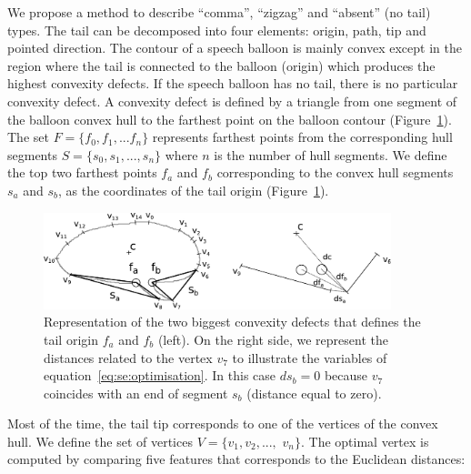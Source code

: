 We propose a method to describe ``comma'', ``zigzag'' and ``absent'' (no tail) types.
The tail can be decomposed into four elements: origin, path, tip and pointed direction.
The contour of a speech balloon is mainly convex except in the region where the tail is connected to the balloon (origin) which produces the highest convexity defects.
If the speech balloon has no tail, there is no particular convexity defect.
A convexity defect is defined by a triangle from one segment of the balloon convex hull to the farthest point on the balloon contour (Figure~\ref{fig:se:convexity_defects}).
The set $F=\{f_0,f_1,...f_n\}$ represents farthest points from the corresponding hull segments $S=\{s_0, s_1,...,s_n\}$ where $n$ is the number of hull segments.
We define the top two farthest points $f_a$ and $f_b$ corresponding to the convex hull segments $s_a$ and $s_b$, as the coordinates of the tail origin (Figure~\ref{fig:se:convexity_defects}).

    \begin{figure}[ht]%
      \centering
      \includegraphics[width=0.9\textwidth]{tail_description.pdf}
    \caption[Representation of the two biggest convexity defects that defines the tail origin]{Representation of the two biggest convexity defects that defines the tail origin $f_a$ and $f_b$ (left). On the right side, we represent the distances related to the vertex $v_7$ to illustrate the variables of equation~\ref{eq:se:optimisation}. In this case $ds_b=0$ because $v_7$ coincides with an end of segment $s_b$ (distance equal to zero).}
    \label{fig:se:convexity_defects}
    \end{figure}

Most of the time, the tail tip corresponds to one of the vertices of the convex hull.
We define the set of vertices $V=\{v_1,v_2,...,$ $v_n\}$.
The optimal vertex is computed by comparing five features that corresponds to the Euclidean distances:

